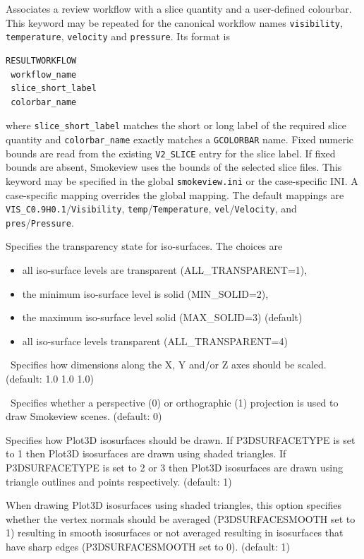 \documentclass[11pt,twoside]{book}
\begin{document}
Associates a review workflow with a slice
quantity and a user-defined colourbar.  This keyword may be repeated for the
canonical workflow names \texttt{visibility}, \texttt{temperature},
\texttt{velocity} and \texttt{pressure}.  Its format is
\begin{lstlisting}
RESULTWORKFLOW
 workflow_name
 slice_short_label
 colorbar_name
\end{lstlisting}
where \texttt{slice\_short\_label} matches the short or long label of the
required slice quantity and \texttt{colorbar\_name} exactly matches a
\texttt{GCOLORBAR} name.  Fixed numeric bounds are read from the existing
\texttt{V2\_SLICE} entry for the slice label.  If fixed bounds are absent,
Smokeview uses the bounds of the selected slice files.  This keyword may be
specified in the global \texttt{smokeview.ini} or the case-specific INI.  A
case-specific mapping overrides the global mapping.  The default mappings are
\texttt{VIS\_C0.9H0.1}/\texttt{Visibility},
\texttt{temp}/\texttt{Temperature}, \texttt{vel}/\texttt{Velocity}, and
\texttt{pres}/\texttt{Pressure}.


Specifies the transparency state for iso-surfaces. The choices
are
\begin{itemize}
\item all iso-surface levels are transparent (ALL\_TRANSPARENT=1),
\item the minimum iso-surface level is solid (MIN\_SOLID=2),
\item the maximum iso-surface level solid (MAX\_SOLID=3) (default)
\item all iso-surface levels transparent (ALL\_TRANSPARENT=4)
\end{itemize}


\ Specifies how dimensions along the X, Y
and/or Z axes should be scaled. (default: 1.0 1.0 1.0)

\ Specifies whether a perspective (0) or orthographic (1) projection
is used to draw Smokeview scenes.
(default: 0)

Specifies how Plot3D isosurfaces should be
drawn.  If P3DSURFACETYPE is set to 1 then Plot3D isosurfaces are
drawn using shaded triangles.  If P3DSURFACETYPE is set to 2 or 3
then Plot3D isosurfaces are drawn using triangle outlines and
points respectively. (default: 1)

When drawing Plot3D isosurfaces using
shaded triangles, this option specifies whether the vertex normals
should be averaged (P3DSURFACESMOOTH set to 1) resulting in smooth
isosurfaces or not averaged resulting in isosurfaces that have
sharp edges (P3DSURFACESMOOTH set to 0). (default: 1)
\end{document}
